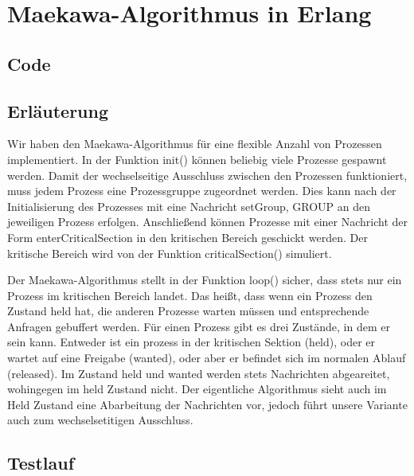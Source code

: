 \documentclass[a4paper,9pt]{article}
\begin{document}
\section{Maekawa-Algorithmus in Erlang}
\subsection{Code}



\vspace{2cm}
\subsection{Erläuterung}
Wir haben den Maekawa-Algorithmus für eine flexible Anzahl von Prozessen implementiert. In der Funktion init() können beliebig viele Prozesse gespawnt werden. Damit der wechselseitige Ausschluss zwischen den Prozessen funktioniert, muss jedem Prozess eine Prozessgruppe zugeordnet werden. Dies kann nach der Initialisierung des Prozesses mit eine Nachricht {setGroup, GROUP} an den jeweiligen Prozess erfolgen. Anschließend können Prozesse mit einer Nachricht der Form enterCriticalSection in den kritischen Bereich geschickt werden. Der kritische Bereich wird von der Funktion criticalSection() simuliert.

Der Maekawa-Algorithmus stellt in der Funktion loop() sicher, dass stets nur ein Prozess im kritischen Bereich landet. Das heißt, dass wenn ein Prozess den Zustand held hat, die anderen Prozesse warten müssen und entsprechende Anfragen gebuffert werden. Für einen Prozess gibt es drei Zustände, in dem er sein kann. Entweder ist ein prozess in der kritischen Sektion (held), oder er wartet auf eine Freigabe (wanted), oder aber er befindet sich im normalen Ablauf (released). Im Zustand held und wanted werden stets Nachrichten abgeareitet, wohingegen im held Zustand nicht. Der eigentliche Algorithmus sieht auch im Held Zustand eine Abarbeitung der Nachrichten vor, jedoch führt unsere Variante auch zum wechselsetitigen Ausschluss.

\pagebreak{}
\subsection{Testlauf}
\end{document}
